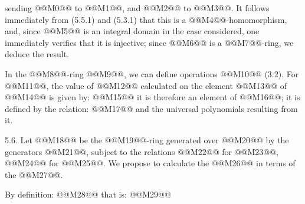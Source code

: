 sending @@M0@@ to @@M1@@, and @@M2@@ to @@M3@@. It follows immediately from (5.5.1) and (5.3.1) that this is a @@M4@@-homomorphism, and, since @@M5@@ is an integral domain in the case considered, one immediately verifies that it is injective; since @@M6@@ is a @@M7@@-ring, we deduce the result.

In the @@M8@@-ring @@M9@@, we can define operations @@M10@@ (3.2). For @@M11@@, the value of @@M12@@ calculated on the element @@M13@@ of @@M14@@ is given by:
@@M15@@
it is therefore an element of @@M16@@; it is defined by the relation:
@@M17@@
and the universal polynomials resulting from it.

5.6. Let @@M18@@ be the @@M19@@-ring generated over @@M20@@ by the generators @@M21@@, subject to the relations @@M22@@ for @@M23@@, @@M24@@ for @@M25@@. We propose to calculate the @@M26@@ in terms of the @@M27@@.

By definition:
@@M28@@
that is:
@@M29@@

